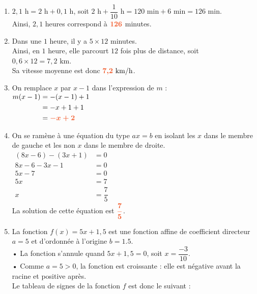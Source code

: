 \documentclass[a4paper,11pt]{article}
\newcounter{seancenum}
\newcounter{seancenumD}
\begin{document}
\setcounter{seancenumD}{13}
\newpage
\begin{seanceD}{} %
\begin{enumerate}
\item  $2{,}1\text{ h} =2 \text{ h} + 0{,}1 \text{ h}$, soit $2\text{ h} + \dfrac{1}{10} \text{ h} = 120 \text{ min} + 6\text{ min} = 126 \text{ min}$.\\
          Ainsi, $2{,}1$ heures correspond à ${\color[HTML]{f15929}\boldsymbol{126}}$ {\color[HTML]{f15929}minutes}.

\item  Dans une $1$ heure, il y a $5\times 12$ minutes.\\
      Ainsi, en $1$ heure, elle parcourt $12$ fois plus de distance, soit $0{,}6\times 12=7{,}2\text{ km}$.\\
      Sa vitesse moyenne est donc ${\color[HTML]{f15929}\boldsymbol{7{,}2}}\text{ km/h}$. 

\item 
 On remplace $x$ par $x-1$ dans l'expression de $m$ :\\
         $\begin{aligned}
        m(x-1)&=-(x-1)+1 \\
        &=-x+1+1\\
        &={\color[HTML]{f15929}\boldsymbol{-x+2}}
        \end{aligned}$


\item  On se ramène à une équation du type $ax=b$ en isolant les  \og{} $x$ \fg{} dans le membre de gauche et les \og{} non $x$ \fg{} dans le membre de droite.\\
    $\begin{aligned}
    (8x-6)-(3x+1)&=0\\
   8x-6-3x-1&=0\\
 5x-7&=0\\
 5x&=7\\
x&= \dfrac{7}{5}
\end{aligned}$\\
    
   La solution de cette équation est  ${\color[HTML]{f15929}\boldsymbol{\dfrac{7}{5}}}$.


\item 
 La fonction $f(x) = 5x+1{,}5$ est une fonction affine de coefficient directeur $a = 5$ et d'ordonnée à l'origine $b = 1.5$.\\
    • La fonction s'annule quand $5x+1{,}5 = 0$, soit $x = \dfrac{-3}{10}$.\\
    • Comme $a = 5 > 0$, la fonction est croissante : elle est négative avant la racine et positive après.\\
    Le tableau de signes de la fonction $f$ est donc le suivant :\\


\end{enumerate}
\end{seanceD}
\end{document}

